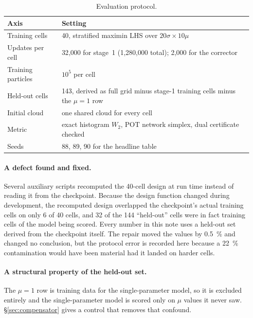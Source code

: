 ﻿\documentclass[11pt,a4paper]{article}
\newcommand{\Wtwo}{W_2}
\begin{document}
\begin{table}[h]
\centering\small
\begin{tabular}{@{}p{}p{}@{}}
\toprule
Axis & Setting \\
\midrule
Training cells & 40, stratified maximin LHS over $20\sigma\times10\mu$ \\
Updates per cell & 32{,}000 for stage~1 (1{,}280{,}000 total); 2{,}000 for the corrector \\
Training particles & $10^5$ per cell \\
Held-out cells & 143, derived as full grid minus stage-1 training cells minus the $\mu{=}1$ row \\
Initial cloud & one shared cloud for every cell \\
Metric & exact histogram $\Wtwo$, POT network simplex, dual certificate checked \\
Seeds & 88, 89, 90 for the headline table \\
\bottomrule
\end{tabular}
\caption{Evaluation protocol.}
\end{table}

\paragraph{A defect found and fixed.}
Several auxiliary scripts recomputed the 40-cell design at run time instead of reading it from
the checkpoint. Because the design function changed during development, the recomputed design
overlapped the checkpoint's actual training cells on only 6 of 40 cells, and 32 of the 144
``held-out'' cells were in fact training cells of the model being scored. Every number in this
note uses a held-out set derived from the checkpoint itself. The repair moved the values by
\SI{0.5}{\percent} and changed no conclusion, but the protocol error is recorded here because a
\SI{22}{\percent} contamination would have been material had it landed on harder cells.

\paragraph{A structural property of the held-out set.}
The $\mu=1$ row is training data for the single-parameter model, so it is excluded entirely and
the single-parameter model is scored only on $\mu$ values it never saw.
\S\ref{sec:compensator} gives a control that removes that confound.

\end{document}
